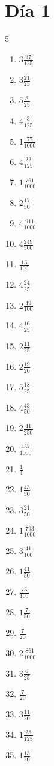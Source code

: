 \documentclass[12pt]{article}
\begin{document}
\section*{Día 1}
\begin{multicols}{5}\begin{enumerate}
\item $ 3 \frac{97}{125} $
\item $ 3 \frac{21}{25} $
\item $ 5 \frac{8}{25} $
\item $ 4 \frac{3}{125} $
\item $ 1 \frac{77}{1000} $
\item $ 4 \frac{22}{125} $
\item $ 1 \frac{761}{1000} $
\item $ 2 \frac{17}{50} $
\item $ 4 \frac{911}{1000} $
\item $ 4 \frac{249}{500} $
\item $ \frac{13}{100} $
\item $ 4 \frac{24}{25} $
\item $ 2 \frac{49}{100} $
\item $ 4 \frac{16}{25} $
\item $ 2 \frac{11}{25} $
\item $ 2 \frac{19}{20} $
\item $ 5 \frac{18}{25} $
\item $ 4 \frac{43}{50} $
\item $ 2 \frac{41}{250} $
\item $ \frac{437}{1000} $
\item $ \frac{1}{4} $
\item $ 1 \frac{43}{50} $
\item $ 3 \frac{21}{50} $
\item $ 1 \frac{793}{1000} $
\item $ 3 \frac{41}{100} $
\item $ 1 \frac{41}{50} $
\item $ \frac{73}{100} $
\item $ 1 \frac{7}{50} $
\item $ \frac{7}{20} $
\item $ 2 \frac{861}{1000} $
\item $ 3 \frac{6}{25} $
\item $ \frac{7}{20} $
\item $ 3 \frac{11}{20} $
\item $ 1 \frac{28}{125} $
\item $ 1 \frac{13}{20} $

\end{enumerate}
\end{multicols}
\end{document}
